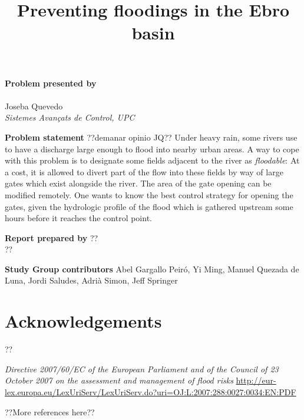 \documentclass[a4paper,12pt,english]{article}
\title{Preventing floodings in the Ebro basin}
\begin{document}
\maketitle

\begin{center}
\textbf{Problem presented by} \\ \ \\ \large Joseba Quevedo \\ \normalsize \textit{Sistemes Avan{\c c}ats de Control, UPC}
\end{center}

\begin{center}
\textbf{Problem statement}
??demanar opinio JQ??
Under heavy rain, some rivers use to have a discharge large enough to flood into
nearby urban areas.
A way to cope with this problem is to designate some fields adjacent to the river as \emph{floodable}:
At a cost, it is allowed to divert part of the flow into these fields by way of large gates
which exist alongside the river. The area of the gate opening can be modified remotely.
One wants to know the best control strategy for opening the gates, given the hydrologic profile
of the flood which is gathered upstream some hours before it reaches the control point.
\end{center}



\begin{center}
\textbf{Report prepared by} ?? \\ ??
\end{center}


\begin{center}
\textbf{Study Group contributors}
Abel Gargallo Peir\'o,
Yi Ming,
Manuel Quezada de Luna,
Jordi Saludes,
Adri\`a Simon,
Jeff Springer
\end{center}

\newpage


\section*{Acknowledgements}
??

\begin{thebibliography}{99}
\emph{Directive 2007/60/EC of the European Parliament and of the Council of 23 October 2007 on the assessment and management of flood risks}
\url{http://eur-lex.europa.eu/LexUriServ/LexUriServ.do?uri=OJ:L:2007:288:0027:0034:EN:PDF}

??More references here??
\end{thebibliography}
\end{document}
